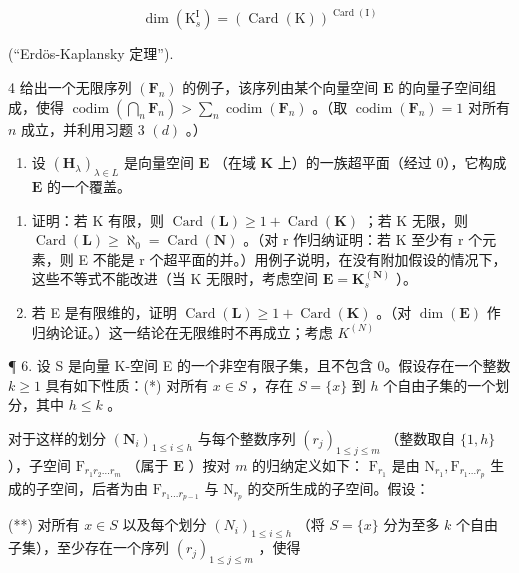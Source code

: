 \[
\dim (\mathrm{K} _ {s} ^ {\mathrm{I}}) = (\operatorname{Card} (\mathrm{K})) ^ {\operatorname{Card} (\mathrm{I})}
\]

(``Erdös-Kaplansky 定理'').

4 给出一个无限序列 \((\mathbf{F}_n)\) 的例子，该序列由某个向量空间 \(\mathbf{E}\) 的向量子空间组成，使得 \(\operatorname{codim}\left(\bigcap_{n} \mathbf{F}_n\right) > \sum_{n} \operatorname{codim}(\mathbf{F}_n)\) 。（取 \(\operatorname{codim}(\mathbf{F}_n) = 1\) 对所有 \(n\) 成立，并利用习题 3 \((d)\) 。）

\begin{enumerate}
\def\labelenumi{\arabic{enumi}.}
\setcounter{enumi}{4}
\tightlist
\item
  设 \((\mathbf{H}_{\lambda})_{\lambda \in L}\) 是向量空间 \(\mathbf{E}\) （在域 \(\mathbf{K}\) 上）的一族超平面（经过 0），它构成 \(\mathbf{E}\) 的一个覆盖。
\end{enumerate}

\begin{enumerate}
\def\labelenumi{(\alph{enumi})}
\item
  证明：若 K 有限，则 \(\operatorname{Card}(\mathbf{L}) \geqslant 1 + \operatorname{Card}(\mathbf{K})\) ；若 K 无限，则 \(\operatorname{Card}(\mathbf{L}) \geqslant \aleph_{0} = \operatorname{Card}(\mathbf{N})\) 。（对 r 作归纳证明：若 K 至少有 r 个元素，则 E 不能是 r 个超平面的并。）用例子说明，在没有附加假设的情况下，这些不等式不能改进（当 K 无限时，考虑空间 \(\mathbf{E} = \mathbf{K}_{s}^{(\mathbf{N})}\) ）。
\item
  若 E 是有限维的，证明 \(\operatorname{Card}(\mathbf{L}) \geqslant 1 + \operatorname{Card}(\mathbf{K})\) 。（对 \(\dim(\mathbf{E})\) 作归纳论证。）这一结论在无限维时不再成立；考虑 \(K^{(N)}\)
\end{enumerate}

¶ 6. 设 S 是向量 K-空间 E 的一个非空有限子集，且不包含 0。假设存在一个整数 \(k \geqslant 1\) 具有如下性质：(*) 对所有 \(x \in S\) ，存在 \(S = \{x\}\) 到 \(h\) 个自由子集的一个划分，其中 \(h \leqslant k\) 。

对于这样的划分 \((\mathbf{N}_i)_{1\leqslant i\leqslant h}\) 与每个整数序列 \((r_j)_{1\leqslant j\leqslant m}\) （整数取自 \(\{1,h\}\) ），子空间 \(\mathrm{F}_{r_1r_2\dots r_m}\) （属于 \(\mathbf{E}\) ）按对 \(m\) 的归纳定义如下： \(\mathrm{F}_{r_1}\) 是由 \(\mathrm{N}_{r_1},\mathrm{F}_{r_1\dots r_p}\) 生成的子空间，后者为由 \(\mathrm{F}_{r_1\dots r_{p-1}}\) 与 \(\mathrm{N}_{r_p}\) 的交所生成的子空间。假设：

(**) 对所有 \(x \in S\) 以及每个划分 \((N_i)_{1 \leqslant i \leqslant h}\) （将 \(S = \{x\}\) 分为至多 \(k\) 个自由子集），至少存在一个序列 \((r_j)_{1 \leqslant j \leqslant m}\) ，使得


